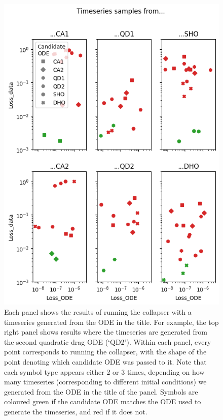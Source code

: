 \documentclass{article}
\begin{document}
\begin{figure}
\includegraphics{images/results/quantitative_experiments.png}
\centering
\caption{
Each panel shows the results of running the collapser with a timeseries generated from the ODE in the title.
For example, the top right panel shows results where the timeseries are generated from the second quadratic drag ODE  (`QD2').
Within each panel, every point corresponds to running the collapser, with the shape of the point denoting which candidate ODE was passed to it.
Note that each symbol type appears either 2 or 3 times, depending on how many timeseries (corresponding to different initial conditions) we generated from the ODE in the title of the panel.
Symbols are coloured green if the candidate ODE matches the ODE used to generate the timeseries, and red if it does not.
}
\label{fig:quantitative_experiments}
\end{figure}
\end{document}
